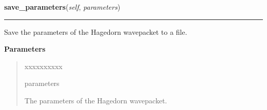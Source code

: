 \hspace{.8\funcindent}\begin{boxedminipage}{\funcwidth}

    \raggedright \textbf{save\_parameters}(\textit{self}, \textit{parameters})

    \vspace{-1.5ex}

    \rule{\textwidth}{0.5\fboxrule}
\setlength{\parskip}{2ex}
    Save the parameters of the Hagedorn wavepacket to a file.

\setlength{\parskip}{1ex}
      \textbf{Parameters}
      \vspace{-1ex}

      \begin{quote}
        \begin{Ventry}{xxxxxxxxxx}

          \item[parameters]

          The parameters of the Hagedorn wavepacket.

        \end{Ventry}

      \end{quote}

    \end{boxedminipage}

